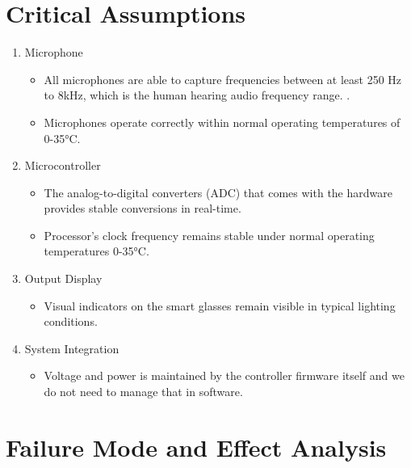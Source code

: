 \documentclass{article}
\begin{document}
\section{Critical Assumptions}

\begin{enumerate}
    \item Microphone
    \begin{itemize}
        \item All microphones are able to capture frequencies between at least
        250 Hz to 8kHz, which is the human hearing audio frequency range.
        \cite{MiracleEar2025}.
        \item Microphones operate correctly within normal operating temperatures
        of 0-35°C. 
    \end{itemize}
    
    \item Microcontroller
    \begin{itemize}
        \item The analog-to-digital converters (ADC) that comes with the
        hardware provides stable conversions in real-time.
        \item Processor's clock frequency remains stable under normal operating
        temperatures 0-35°C.
    \end{itemize}

    \item Output Display
    \begin{itemize}
        \item Visual indicators on the smart glasses remain visible in typical
        lighting conditions. 
    \end{itemize}

    \item System Integration
    \begin{itemize}
        \item Voltage and power is maintained by the controller firmware itself
        and we do not need to manage that in software. 
    \end{itemize}
    
\end{enumerate}

\section{Failure Mode and Effect Analysis}
\end{document}
